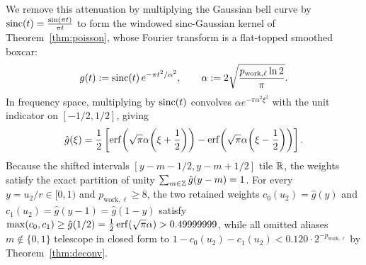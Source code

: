 We remove this attenuation by multiplying the Gaussian bell curve by $\operatorname{sinc}(t) = \frac{\sin(\pi t)}{\pi t}$ to form the windowed sinc-Gaussian kernel of Theorem~\ref{thm:poisson}, whose Fourier transform is a flat-topped smoothed boxcar:
\begin{equation}\label{eq:overview-kernel}
  g(t) := \operatorname{sinc}(t)\, e^{-\pi t^2 / \alpha^2}, \qquad \alpha := 2\sqrt{\frac{p_{\mathrm{work},\ell}\ln 2}{\pi}}.
\end{equation}
In frequency space, multiplying by $\operatorname{sinc}(t)$ convolves $\alpha e^{-\pi \alpha^2 \xi^2}$ with the unit indicator on $[-1/2, 1/2]$, giving
\[
  \hat{g}(\xi) = \frac{1}{2}\left[\operatorname{erf}\!\left(\sqrt{\pi}\alpha\!\left(\xi + \frac{1}{2}\right)\right) - \operatorname{erf}\!\left(\sqrt{\pi}\alpha\!\left(\xi - \frac{1}{2}\right)\right)\right].
\]
Because the shifted intervals $[y - m - 1/2, y - m + 1/2]$ tile $\mathbb{R}$, the weights satisfy the exact partition of unity $\sum_{m \in \mathbb{Z}} \hat{g}(y - m) = 1$. For every $y = u_2 / r \in [0, 1)$ and $p_{\mathrm{work},\ell} \ge 8$, the two retained weights $c_0(u_2) = \hat{g}(y)$ and $c_1(u_2) = \hat{g}(y - 1) = \hat{g}(1 - y)$ satisfy $\max(c_0, c_1) \ge \hat{g}(1/2) = \frac{1}{2}\operatorname{erf}(\sqrt{\pi}\alpha) > 0.49999999$, while all omitted aliases $m \notin \{0, 1\}$ telescope in closed form to $1 - c_0(u_2) - c_1(u_2) < 0.120 \cdot 2^{-p_{\mathrm{work},\ell}}$ by Theorem~\ref{thm:deconv}.

